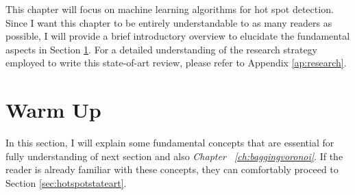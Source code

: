 This chapter will focus on machine learning algorithms for hot spot detection. Since I want this chapter to be entirely understandable to as many readers as possible, I will provide a brief introductory overview to elucidate the fundamental aspects in Section \ref{sec:introperritardati}. For a detailed understanding of the research strategy employed to write this state-of-art review, please refer to Appendix \ref{ap:research}. 

\section{Warm Up}
\label{sec:introperritardati}
In this section, I will explain some fundamental concepts that are essential for fully understanding of next section and also \emph{Chapter ~\ref{ch:baggingvoronoi}}. If the reader is already familiar with these concepts, they can comfortably proceed to Section \ref{sec:hotspotstateart}. 

